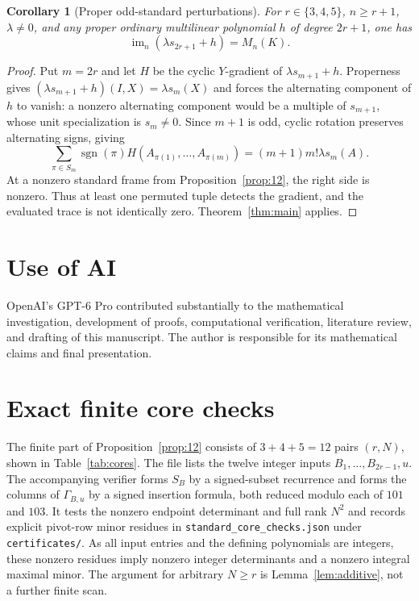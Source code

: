 \documentclass[11pt,reqno]{amsart}
\newcommand{\im}{\operatorname{im}}
\theoremstyle{plain}
\newtheorem{corollary}[theorem]{Corollary}
\theoremstyle{definition}
\numberwithin{equation}{section}
\begin{document}
\begin{corollary}[Proper odd-standard perturbations]\label{cor:proper}
For $r\in\{3,4,5\}$, $n\ge r+1$, $\lambda\ne0$, and any proper ordinary multilinear polynomial $h$ of degree $2r+1$, one has
\[
 \im_n(\lambda s_{2r+1}+h)=M_n(K).
\]
\end{corollary}
\begin{proof}
Put $m=2r$ and let $H$ be the cyclic $Y$-gradient of $\lambda s_{m+1}+h$.  Properness gives $(\lambda s_{m+1}+h)(I,X)=\lambda s_m(X)$ and forces the alternating component of $h$ to vanish: a nonzero alternating component would be a multiple of $s_{m+1}$, whose unit specialization is $s_m\ne0$.  Since $m+1$ is odd, cyclic rotation preserves alternating signs, giving
\begin{equation}\label{eq:properalt}
 \sum_{\pi\in S_m}\operatorname{sgn}(\pi)H(A_{\pi(1)},\ldots,A_{\pi(m)})
 =(m+1)m!\lambda s_m(A).
\end{equation}
At a nonzero standard frame from Proposition~\ref{prop:12}, the right side is nonzero.  Thus at least one permuted tuple detects the gradient, and the evaluated trace is not identically zero.  Theorem~\ref{thm:main} applies.  
\end{proof}

\section*{Use of AI}
OpenAI's GPT-6 Pro contributed substantially to the mathematical investigation, development of proofs, computational verification, literature review, and drafting of this manuscript.  The author is responsible for its mathematical claims and final presentation.

\appendix
\section{Exact finite core checks}\label{app:finite}
The finite part of Proposition~\ref{prop:12} consists of $3+4+5=12$ pairs $(r,N)$, shown in Table~\ref{tab:cores}.  The file  lists the twelve integer inputs $B_1,\ldots,B_{2r-1},u$.  The accompanying verifier forms $S_B$ by a signed-subset recurrence and forms the columns of $\Gamma_{B,u}$ by a signed insertion formula, both reduced modulo each of $101$ and $103$.  It tests the nonzero endpoint determinant and full rank $N^2$ and records explicit pivot-row minor residues in \texttt{standard\_core\_checks.json} under \texttt{certificates/}.  As all input entries and the defining polynomials are integers, these nonzero residues imply nonzero integer determinants and a nonzero integral maximal minor.  The argument for arbitrary $N\ge r$ is Lemma~\ref{lem:additive}, not a further finite scan.
\end{document}
